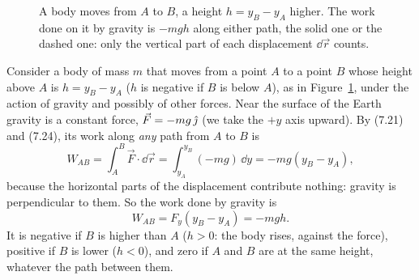 \documentclass[11pt,a4paper]{article}
\begin{document}
\begin{figure}[ht]
\centering
{}
\caption{A body moves from $A$ to $B$, a height $h = y_B - y_A$ higher. The work done on it by
gravity is $-mgh$ along either path, the solid one or the dashed one: only the vertical part of each
displacement $\dd\vec{r}$ counts.}\label{fig:gravwork}
\end{figure}

Consider a body of mass $m$ that moves from a point $A$ to a point $B$ whose height above $A$ is
$h = y_B - y_A$ ($h$ is negative if $B$ is below $A$), as in Figure~\ref{fig:gravwork}, under the
action of gravity and possibly of other forces. Near the
surface of the Earth gravity is a constant force, $\vec{F} = -mg\,\hat{\jmath}$ (we take the $+y$ axis
upward). By \textup{(7.21)} and \textup{(7.24)}, its work along \emph{any} path from $A$ to $B$ is
\[
  W_{AB} = \int_A^B \vec{F}\cdot\dd\vec{r} = \int_{y_A}^{y_B} (-mg)\,\dd y = -mg(y_B - y_A) ,
\]
because the horizontal parts of the displacement contribute nothing: gravity is perpendicular to
them. So the work done by gravity is
\begin{equation}\label{eq:Wgrav}
  W_{AB} = F_y (y_B - y_A) = -mgh .
\end{equation}
It is negative if $B$ is higher than $A$ ($h > 0$: the body rises, against the force), positive if
$B$ is lower ($h < 0$), and zero if $A$ and $B$ are at the same height, whatever the path between
them.
\end{document}
